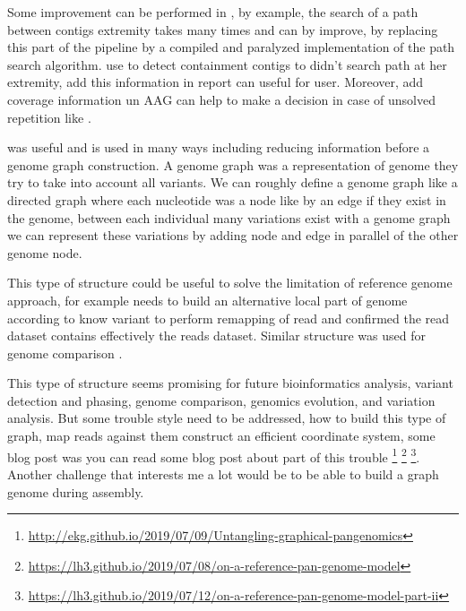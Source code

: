 \documentclass[main.tex]{subfiles}
\begin{document}

\bigskip

Some improvement can be performed in \knot, by example, the search of a path between contigs extremity takes many times and can by improve, by replacing this part of the pipeline by a compiled and paralyzed implementation of the path search algorithm. \knot use \minimap to detect containment contigs to didn't search path at her extremity, add this information in \knot report can useful for user. Moreover, add coverage information un AAG can help to make a decision in case of unsolved repetition like \flye.


\bigskip

\fpa was useful and is used in many ways including reducing information before a genome graph construction. A genome graph was a representation of genome they try to take into account all variants. We can roughly define a genome graph like a directed graph where each nucleotide was a node like by an edge if they exist in the genome, between each individual many variations exist with a genome graph we can represent these variations by adding node and edge in parallel of the other genome node.

This type of structure could be useful to solve the limitation of reference genome approach, for example  \cite{whatshap} needs to build an alternative local part of genome according to know variant to perform remapping of read and confirmed the read dataset contains effectively the reads dataset. Similar structure was used for genome comparison  \cite{cactus_graph}.

This type of structure seems promising for future bioinformatics analysis, variant detection and phasing, genome comparison,  genomics evolution, and variation analysis. But some trouble style need to be addressed, how to build this type of graph, map reads against them construct an efficient coordinate system, some blog post was you can read some blog post about part of this trouble \footnote{\url{http://ekg.github.io/2019/07/09/Untangling-graphical-pangenomics}} \footnote{\url{https://lh3.github.io/2019/07/08/on-a-reference-pan-genome-model}} \footnote{\url{https://lh3.github.io/2019/07/12/on-a-reference-pan-genome-model-part-ii}}. Another challenge that interests me a lot would be to be able to build a graph genome during assembly.
\end{document}
